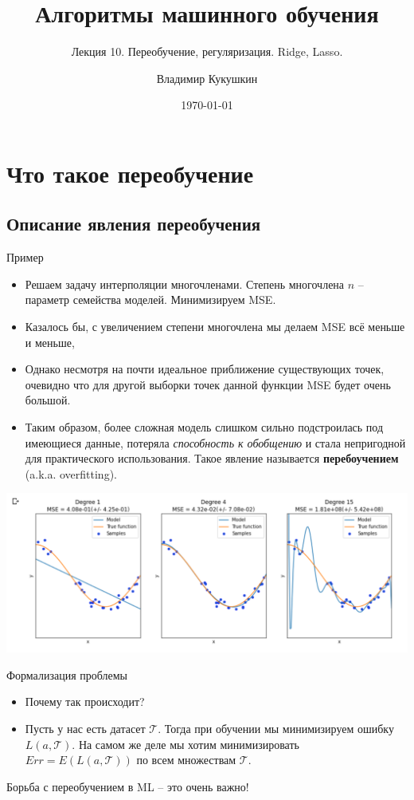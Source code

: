 \documentclass[9pt]{beamer}
\title{Алгоритмы машинного обучения}
\subtitle{Лекция 10. Переобучение, регуляризация. Ridge, Lasso.}
\author{Владимир Кукушкин}
\institute{СПбГЭУ - 03.03.2021}
\date{\today}
\begin{document}
\titlepage

\section{Что такое переобучение}
\subsection{Описание явления переобучения}

\begin{frame}{Пример}
\begin{itemize}
    \item Решаем задачу интерполяции многочленами. Степень многочлена $n$ -- параметр семейства моделей. Минимизируем MSE.
    \item Казалось бы, с увеличением степени многочлена мы делаем MSE всё меньше и меньше,
    \item Однако несмотря на почти идеальное приближение существующих точек, очевидно что для другой выборки точек данной функции MSE будет очень большой.
    \item Таким образом, более сложная модель слишком сильно подстроилась под имеющиеся данные, потеряла \textit{способность к обобщению} и стала непригодной для практического использования. Такое явление называется \textbf{перебоучением} (a.k.a. overfitting).
\end{itemize}
\begin{center}
    \includegraphics[height=0.35\textheight]{img/underfitting_overfitting.png}
\end{center}
\end{frame}

\begin{frame}{Формализация проблемы}
    \begin{itemize}
        \item Почему так происходит?
        \item Пусть у нас есть датасет $\mathcal{T}$. Тогда при обучении мы минимизируем ошибку $L(a, \mathcal{T})$. На самом же деле мы хотим минимизировать $Err = E(L(a, \mathcal{T}))$ по всем множествам $\mathcal{T}$.
    \end{itemize}
Борьба с переобучением в ML -- это очень важно!
\end{frame}
\end{document}
